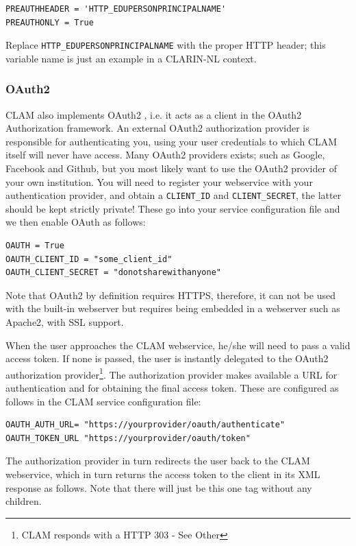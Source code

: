 \documentclass[a4paper,12pt,twoside,openright]{report}
\begin{document}
{ \small
\begin{verbatim}
PREAUTHHEADER = 'HTTP_EDUPERSONPRINCIPALNAME'
PREAUTHONLY = True
\end{verbatim}
}

Replace \texttt{HTTP\_EDUPERSONPRINCIPALNAME} with the proper HTTP header; this
variable name is just an example in a CLARIN-NL context.

\subsubsection{OAuth2}

CLAM also implements OAuth2 \cite{OAUTH2}, i.e. it acts as a client in the
OAuth2 Authorization framework. An external OAuth2 authorization provider is
responsible for authenticating you, using your user credentials to which CLAM
itself will never have access. Many OAuth2 providers exists; such as Google,
Facebook and Github, but you most likely want to use the OAuth2 provider of
your own institution. You will need to register your webservice with your
authentication provider, and obtain a \texttt{CLIENT\_ID} and
\texttt{CLIENT\_SECRET}, the latter should be kept strictly private! These go
into your service configuration file and we then enable OAuth as follows: 

{ \small
\begin{verbatim}
OAUTH = True
OAUTH_CLIENT_ID = "some_client_id"
OAUTH_CLIENT_SECRET = "donotsharewithanyone"
\end{verbatim}
}

Note that OAuth2 by definition requires HTTPS, therefore, it can not be used
with the built-in webserver but requires being embedded in a webserver such as
Apache2, with SSL support.

When the user approaches the CLAM webservice, he/she will need to pass a valid
access token. If none is passed, the user is instantly delegated to the OAuth2
authorization provider\footnote{CLAM responds with a HTTP 303 - See Other}.
The authorization provider makes available a URL for authentication and for
obtaining the final access token. These are configured as follows in the CLAM
service configuration file: 


{ \small
\begin{verbatim}
OAUTH_AUTH_URL= "https://yourprovider/oauth/authenticate"
OAUTH_TOKEN_URL "https://yourprovider/oauth/token"
\end{verbatim}
}

The authorization provider in turn redirects the user back to the CLAM
webservice, which in turn returns the access token to the client in its XML
response as follows. Note that there will just be this one tag without any
children.
\end{document}
